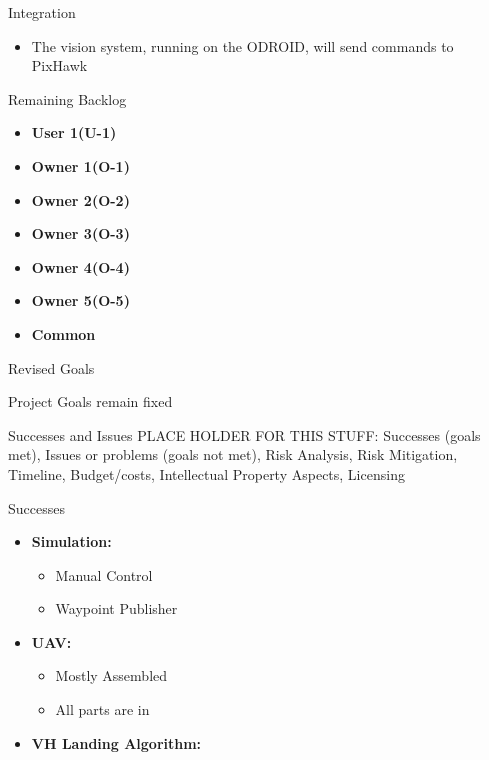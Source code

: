 \documentclass[11pt]{beamer}
\begin{document}
\begin{frame}{Integration}
	\begin{itemize}
		\item The vision system, running on the ODROID, will send commands to PixHawk
	\end{itemize}
\end{frame}


\begin{frame}{Remaining Backlog}
\begin{itemize}
\item \textbf{User 1(U-1)}
\item \textbf{Owner 1(O-1)}
\item \textbf{Owner 2(O-2)}
\item \textbf{Owner 3(O-3)}
\item \textbf{Owner 4(O-4)}
\item \textbf{Owner 5(O-5)}
\item \textbf{Common}
\end{itemize}

\end{frame}


\begin{frame}{Revised Goals}

Project Goals remain fixed

\end{frame}




\begin{frame}{Successes and Issues}
PLACE HOLDER FOR THIS STUFF:
Successes (goals met), Issues or problems (goals not met), Risk Analysis, Risk Mitigation, Timeline,
Budget/costs, Intellectual Property Aspects, Licensing
\end{frame}

\begin{frame}{Successes}
\begin{itemize}
\item \textbf{Simulation:}\\
\begin{itemize}
\item Manual Control
\item Waypoint Publisher
\end{itemize}
\item \textbf{UAV:}\\
\begin{itemize}
\item Mostly Assembled
\item All parts are in
\end{itemize}
\item \textbf{VH Landing Algorithm:}\\
\end{itemize}
\end{frame}
\end{document}
